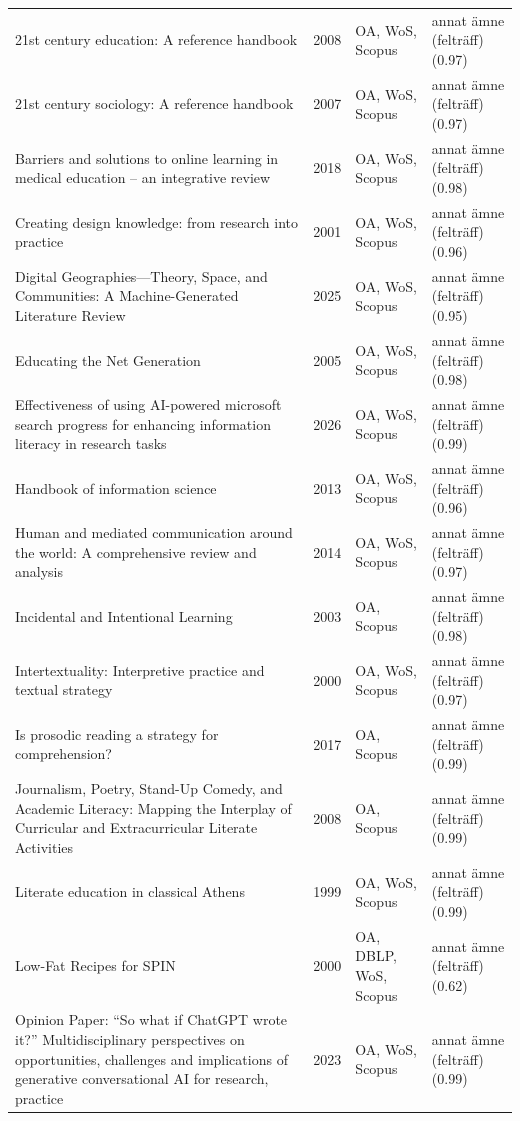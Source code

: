 \begin{longtable}{@{}%
  >{\raggedright\arraybackslash}p{}c%
  >{\raggedright\arraybackslash}p{}%
  >{\raggedright\arraybackslash}p{}@{}}
21st century education: A reference handbook & 2008 & OA, WoS, Scopus & annat ämne (felträff) (0.97) \\
21st century sociology: A reference handbook & 2007 & OA, WoS, Scopus & annat ämne (felträff) (0.97) \\
Barriers and solutions to online learning in medical education -- an integrative review & 2018 & OA, WoS, Scopus & annat ämne (felträff) (0.98) \\
Creating design knowledge: from research into practice & 2001 & OA, WoS, Scopus & annat ämne (felträff) (0.96) \\
Digital Geographies---Theory, Space, and Communities: A Machine-Generated Literature Review & 2025 & OA, WoS, Scopus & annat ämne (felträff) (0.95) \\
Educating the Net Generation & 2005 & OA, WoS, Scopus & annat ämne (felträff) (0.98) \\
Effectiveness of using AI-powered microsoft search progress for enhancing information literacy in research tasks & 2026 & OA, WoS, Scopus & annat ämne (felträff) (0.99) \\
Handbook of information science & 2013 & OA, WoS, Scopus & annat ämne (felträff) (0.96) \\
Human and mediated communication around the world: A comprehensive review and analysis & 2014 & OA, WoS, Scopus & annat ämne (felträff) (0.97) \\
Incidental and Intentional Learning & 2003 & OA, Scopus & annat ämne (felträff) (0.98) \\
Intertextuality: Interpretive practice and textual strategy & 2000 & OA, WoS, Scopus & annat ämne (felträff) (0.97) \\
Is prosodic reading a strategy for comprehension? & 2017 & OA, Scopus & annat ämne (felträff) (0.99) \\
Journalism, Poetry, Stand-Up Comedy, and Academic Literacy: Mapping the Interplay of Curricular and Extracurricular Literate Activities & 2008 & OA, Scopus & annat ämne (felträff) (0.99) \\
Literate education in classical Athens & 1999 & OA, WoS, Scopus & annat ämne (felträff) (0.99) \\
Low-Fat Recipes for SPIN & 2000 & OA, DBLP, WoS, Scopus & annat ämne (felträff) (0.62) \\
Opinion Paper: ``So what if ChatGPT wrote it?'' Multidisciplinary perspectives on opportunities, challenges and implications of generative conversational AI for research, practice  & 2023 & OA, WoS, Scopus & annat ämne (felträff) (0.99) \\

\end{longtable}
